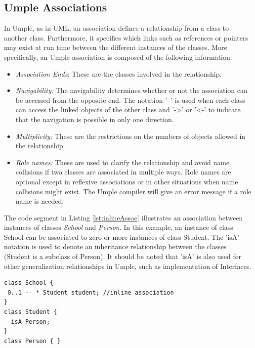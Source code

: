 \subsection{Umple Associations}

In Umple, as in UML, an association defines a relationship from a class to another class. Furthermore, it specifies which links such as references or pointers may exist at run time between the different instances of the classes.
More specifically, an Umple association is composed of the following information:

\begin{itemize}
\item \textit{Association Ends}: These are the classes involved in the relationship.
\item \textit{Navigability:} The navigability determines whether or not the association can be accessed from the opposite end. The notation '--' is used when each class can access the linked objects of the other class and '-\textgreater{}' or '\textless{}-' to indicate that the navigation is possible in only one direction.
\item \textit{Multiplicity:} These are the restrictions on the numbers of objects allowed in the relationship.
\item \textit{Role names:} These are used to clarify the relationship and avoid name collisions if two classes are associated in multiple ways. Role names are optional except in reflexive associations or in other situations when name collisions might exist. The Umple compiler will give an error message if a role name is needed.
\end{itemize}


The code segment in Listing \ref{lst:inlineAssoc} illustrates an association between instances of classes \emph{School} and \emph{Person}. In this example, an instance of class School can be associated to zero or more instances of class Student. The 'isA' notation is used to denote an inheritance relationship between the classes (Student is a subclass of Person). It should be noted that 'isA' is also used for other generalization relationships in Umple, such as implementation of Interfaces.

\begin{lstlisting}[style=umplePlain, caption=An example of an inline Umple Association, label=lst:inlineAssoc]
class School {
 0..1 -- * Student student; //inline association
}
class Student {
  isA Person;
}
class Person { }
\end{lstlisting}

